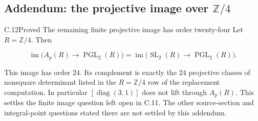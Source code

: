 \subsection*{Addendum: the projective image over
\texorpdfstring{$\mathbb Z/4$}{Z/4}}

\begin{statement}{C.12}{Proved}
{The remaining finite projective image has order twenty-four}
Let $R=\mathbb Z/4$. Then

$$
\operatorname{im}\bigl(A_p(R)\longrightarrow\operatorname{PGL}_2(R)\bigr)
 =
 \operatorname{im}\bigl(\operatorname{SL}_2(R)
                  \longrightarrow\operatorname{PGL}_2(R)\bigr).
$$

This image has order $24$. Its complement is exactly the $24$
projective classes of nonsquare determinant listed in the
$R=\mathbb Z/4$ row of the replacement computation. In particular
$[\operatorname{diag}(3,1)]$ does not lift through $A_p(R)$.
This settles the finite image question left open in C.11.
The other source-section and integral-point questions stated there
are not settled by this addendum.
\end{statement}

